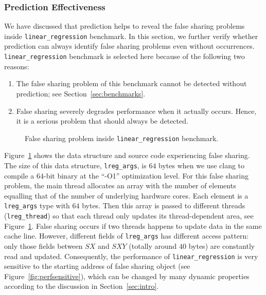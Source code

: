 \subsubsection{Prediction Effectiveness}
\label{sec:predicteval}
We have discussed that prediction helps to reveal the false sharing problems inside \texttt{linear\_regression} benchmark. In this section, we further verify whether prediction can always identify 
false sharing problems even without occurrences.
\texttt{linear\_regression} benchmark is selected here because of the following two reasons:
\begin{enumerate}
\item
The false sharing problem of this benchmark cannot be detected without prediction; see Section~\ref{sec:benchmarks}. 

\item
False sharing severely degrades performance when it actually occurs. 
Hence, it is a serious problem that should always be detected. 
\end{enumerate}

\begin{figure}[!h]
{\centering
\subfigure{}
\caption{False sharing problem inside \texttt{linear\_regression} benchmark.
\label{fig:linearregression}}
}
\end{figure}

Figure~\ref{fig:linearregression} shows the data structure and source code
experiencing false sharing.
The size of this data structure, \texttt{lreg\_args}, is $64$ bytes 
when we use clang to compile a $64$-bit binary at the ``-O1'' optimization level.
For this false sharing problem, the main thread allocates an array with the number of elements equalling
that of the number of underlying hardware cores.
Each element is a \texttt{lreg\_args} type with $64$ bytes. 
Then this array is passed to different threads (\texttt{lreg\_thread}) 
so that each thread only updates its thread-dependent area, see Figure~\ref{fig:linearregression}.
False sharing occurs if two threads happens to update data in the same cache line. 
However, different fields of \texttt{lreg\_args} has different access pattern:
only those fields between $SX$ and $SXY$ (totally around $40$ bytes) are constantly read and updated.
Consequently, the performance of \texttt{linear\_regression} is very sensitive to 
the starting address of false sharing object (see Figure~\ref{fig:perfsensitive}),
which can be changed by many dynamic properties according
to the discussion in Section~\ref{sec:intro}.

